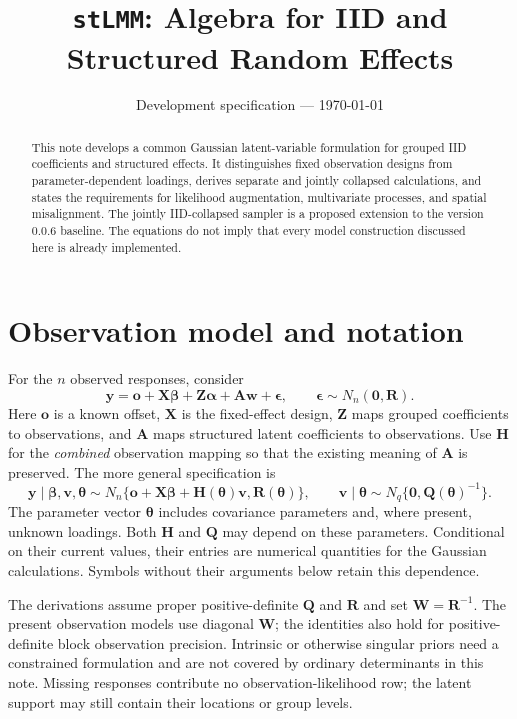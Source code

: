 \documentclass[11pt]{article}
\title{\texttt{stLMM}: Algebra for IID and Structured Random Effects}
\author{}
\date{Development specification --- \today}
\newcommand{\by}{\bm{y}}
\newcommand{\bo}{\bm{o}}
\newcommand{\bw}{\bm{w}}
\newcommand{\bv}{\bm{v}}
\newcommand{\balpha}{\bm{\alpha}}
\newcommand{\bbeta}{\bm{\beta}}
\newcommand{\btheta}{\bm{\theta}}
\newcommand{\bA}{\bm{A}}
\newcommand{\bH}{\bm{H}}
\newcommand{\bQ}{\bm{Q}}
\newcommand{\bR}{\bm{R}}
\newcommand{\bW}{\bm{W}}
\newcommand{\bX}{\bm{X}}
\newcommand{\bZ}{\bm{Z}}
\newcommand{\bzero}{\bm{0}}
\begin{document}
\maketitle
\begin{abstract}
This note develops a common Gaussian latent-variable formulation for grouped
IID coefficients and structured effects. It distinguishes fixed observation
designs from parameter-dependent loadings, derives separate and jointly collapsed
calculations, and states the requirements for likelihood augmentation,
multivariate processes, and spatial misalignment. The jointly IID-collapsed
sampler is a proposed extension to the version 0.0.6 baseline. The equations do
not imply that every model construction discussed here is already implemented.
\end{abstract}
{\small\tableofcontents}
\clearpage

\section{Observation model and notation}
For the $n$ observed responses, consider
\begin{equation}\label{eq:observation}
 \by = \bo + \bX\bbeta + \bZ\balpha + \bA\bw + \bm{\epsilon},
 \qquad \bm{\epsilon}\sim N_n(\bzero,\bR).
\end{equation}
Here $\bo$ is a known offset, $\bX$ is the fixed-effect design, $\bZ$ maps grouped
coefficients to observations, and $\bA$ maps structured latent coefficients to
observations. Use $\bH$ for the \emph{combined} observation mapping so that the
existing meaning of $\bA$ is preserved. The more general specification is
\begin{equation}\label{eq:general}
 \by\mid\bbeta,\bv,\btheta \sim
 N_n\{\bo+\bX\bbeta+\bH(\btheta)\bv,\bR(\btheta)\},
 \qquad
 \bv\mid\btheta\sim N_q\{\bzero,\bQ(\btheta)^{-1}\}.
\end{equation}
The parameter vector $\btheta$ includes covariance parameters and, where present,
unknown loadings. Both $\bH$ and $\bQ$ may depend on these parameters. Conditional
on their current values, their entries are numerical quantities for the Gaussian
calculations. Symbols without their arguments below retain this dependence.

The derivations assume proper positive-definite $\bQ$ and $\bR$ and set
$\bW=\bR^{-1}$. The present observation models use diagonal $\bW$; the identities
also hold for positive-definite block observation precision. Intrinsic or otherwise
singular priors need a constrained formulation and are not covered by ordinary
determinants in this note. Missing responses contribute no observation-likelihood
row; the latent support may still contain their locations or group levels.
\end{document}

